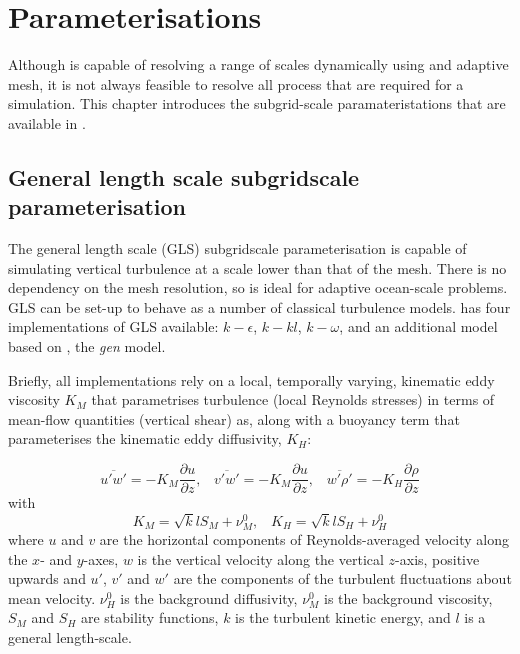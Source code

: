 \chapter{Parameterisations}\label{chap:parameterisations}

Although \fluidity is capable of resolving a range of scales dynamically using 
and adaptive mesh, it is not always feasible to resolve all process that are
required for a simulation. This chapter introduces the subgrid-scale paramateristations
that are available in \fluidity.

\section{General length scale subgridscale parameterisation}\label{Sect:GLS}

The general length scale (GLS) subgridscale parameterisation is capable of simulating vertical
turbulence at a scale lower than that of the mesh. There is no dependency on the mesh resolution, 
so is ideal for adaptive ocean-scale problems. GLS can be set-up to behave as a number of classical
turbulence models. \fluidity has four implementations of GLS available: $k-\epsilon$, $k-kl$, $k-\omega$, 
and an additional model based on \citet{umlauf2003}, the \emph{gen} model. 

Briefly, all implementations rely on a local, temporally varying, kinematic eddy 
viscosity $K_M$ that parametrises turbulence (local Reynolds stresses) in terms of mean-flow 
quantities (vertical shear) as, along 
with a buoyancy term that parameterises the kinematic eddy diffusivity, $K_H$:

\begin{equation}
\overline{u'w'} = -K_M\frac{\partial u}{\partial z},\;\;\;
\overline{v'w'} = -K_M\frac{\partial u}{\partial z},\;\;\;
\overline{w'\rho'} = -K_H\frac{\partial\rho}{\partial z}
\end{equation} 
with
\begin{equation}
K_M = \sqrt{k}lS_M+\nu_M^0, \;\;\;
K_H = \sqrt{k}lS_H+\nu_H^0
\label{eq:diff}
\end{equation}
where $u$ and $v$ are the horizontal components of Reynolds-averaged velocity along the $x$- and $y$-axes, $w$ is 
the vertical velocity along the vertical $z$-axis, positive upwards and $u'$, $v'$ and $w'$ are the components 
of the turbulent fluctuations about mean velocity. $\nu_H^0$ is the background diffusivity, $\nu_M^0$ 
is the background viscosity, $S_M$ and $S_H$ are stability functions, 
$k$ is the turbulent kinetic energy, and $l$ is a general length-scale.


